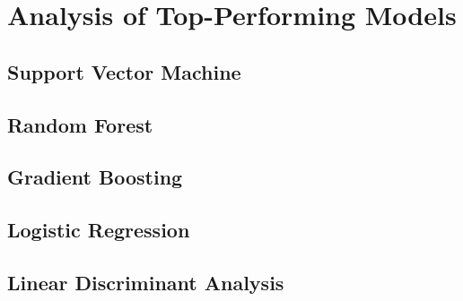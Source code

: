 
    \section{Analysis of Top-Performing Models}
        \subsection{Support Vector Machine}
        \subsection{Random Forest}
        \subsection{Gradient Boosting}
        \subsection{Logistic Regression}
        \subsection{Linear Discriminant Analysis}
